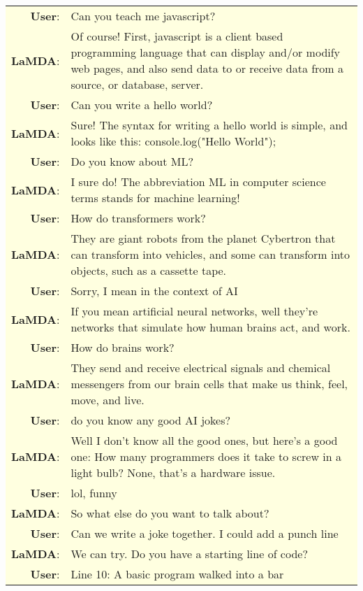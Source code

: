 \documentclass{article}
\begin{document}
\begin{table}[ht!]
\small
\centering
\colorbox{lightyellow}{

\begin{tabular}{rp{12cm}}
\textbf{User}: & Can you teach me javascript? \\
\textbf{LaMDA}: & Of course! First, javascript is a client based programming language that can display and/or modify web pages, and also send data to or receive data from a source, or database, server. \\
\textbf{User}: & Can you write a hello world? \\
\textbf{LaMDA}: & Sure! The syntax for writing a hello world is simple, and looks like this: console.log("Hello World"); \\
\textbf{User}: & Do you know about ML? \\
\textbf{LaMDA}: & I sure do! The abbreviation ML in computer science terms stands for machine learning! \\
\textbf{User}: & How do transformers work? \\
\textbf{LaMDA}: & They are giant robots from the planet Cybertron that can transform into vehicles, and some can transform into objects, such as a cassette tape. \\
\textbf{User}: & Sorry, I mean in the context of AI \\
\textbf{LaMDA}: & If you mean artificial neural networks, well they're networks that simulate how human brains act, and work. \\
\textbf{User}: & How do brains work? \\
\textbf{LaMDA}: & They send and receive electrical signals and chemical messengers from our brain cells that make us think, feel, move, and live. \\
\textbf{User}: & do you know any good AI jokes? \\
\textbf{LaMDA}: & Well I don't know all the good ones, but here's a good one: How many programmers does it take to screw in a light bulb? None, that's a hardware issue. \\
\textbf{User}: & lol, funny \\
\textbf{LaMDA}: & So what else do you want to talk about? \\
\textbf{User}: & Can we write a joke together. I could add a punch line \\
\textbf{LaMDA}: & We can try. Do you have a starting line of code? \\
\textbf{User}: & Line 10: A basic program walked into a bar \\

\end{tabular}}
\end{table}
\end{document}
